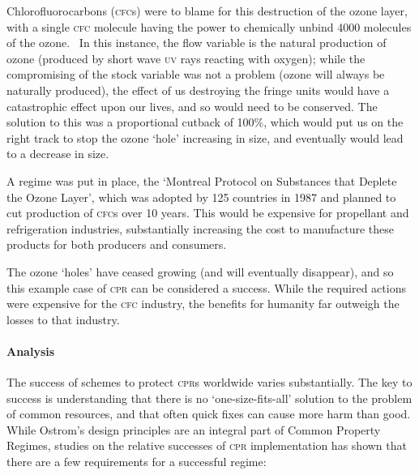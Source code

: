 Chlorofluorocarbons (\textsc{cfc}s) were to blame for this destruction of the ozone layer, with a single \textsc{cfc} molecule having the power to chemically unbind 4000 molecules of the ozone.~\cite{Canada-sea-law} In this instance, the flow variable is the natural production of ozone (produced by short wave \textsc{uv} rays reacting with oxygen); while the compromising of the stock variable was not a problem (ozone will always be naturally produced), the effect of us destroying the fringe units would have a catastrophic effect upon our lives, and so would need to be conserved. The solution to this was a proportional cutback of 100\%, which would put us on the right track to stop the ozone `hole' increasing in size, and eventually would lead to a decrease in size.

A regime was put in place, the `Montreal Protocol on Substances that Deplete the Ozone Layer', which was adopted by 125 countries in 1987 and planned to cut production of \textsc{cfc}s over 10 years. This would be expensive for propellant and refrigeration industries, substantially increasing the cost to manufacture these products for both producers and consumers.

The ozone `holes' have ceased growing (and will eventually disappear), and so this example case of \textsc{cpr} can be considered a success. While the required actions were expensive for the \textsc{cfc} industry, the benefits for humanity far outweigh the losses to that industry.

\paragraph{Analysis}

The success of schemes to protect \textsc{cpr}s worldwide varies substantially. The key to success is understanding that there is no `one-size-fits-all' solution to the problem of common resources, and that often quick fixes can cause more harm than good. While Ostrom's design principles are an integral part of Common Property Regimes, studies on the relative successes of \textsc{cpr} implementation has shown that there are a few requirements for a successful regime:~\cite{Ostrom-challenge-90}

